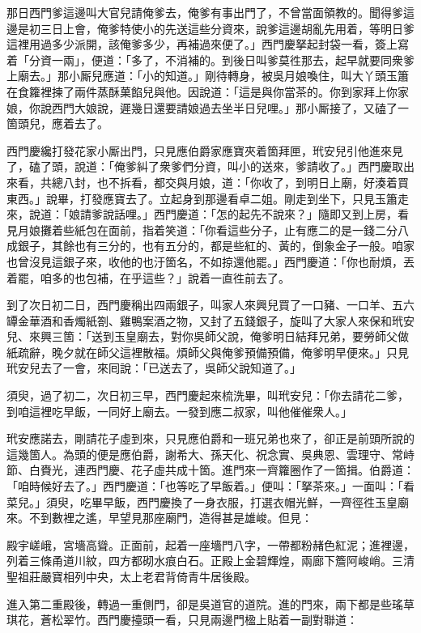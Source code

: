 那日西門爹這邊叫大官兒請俺爹去，俺爹有事出門了，不曾當面領教的。聞得爹這邊是初三日上會，俺爹特使小的先送這些分資來，說爹這邊胡亂先用着，等明日爹這裡用過多少派開，該俺爹多少，再補過來便了。」西門慶拏起封袋一看，簽上寫着「分資一兩」，便道：「多了，不消補的。到後日叫爹莫徃那去，起早就要同衆爹上廟去。」那小厮兒應道：「小的知道。」剛待轉身，被吳月娘喚住，{}叫大丫頭玉簫在食籮裡揀了兩件蒸酥菓餡兒與他。因說道：「這是與你當茶的。你到家拜上你家娘，{}你說西門大娘說，遲幾日還要請娘過去坐半日兒哩。」那小厮接了，又磕了一箇頭兒，應着去了。

西門慶纔打發花家小厮出門，只見應伯爵家應寶夾着箇拜匣，玳安兒引他進來見了，磕了頭，說道：「俺爹糾了衆爹們分資，叫小的送來，爹請收了。」西門慶取出來看，共總八封，也不拆看，都交與月娘，道：「你收了，到明日上廟，好湊着買東西。」說畢，打發應寶去了。立起身到那邊看卓二姐。剛走到坐下，只見玉簫走來，說道：「娘請爹說話哩。」{}西門慶道：「怎的起先不說來？」隨即又到上房，看見月娘攤着些紙包在面前，指着笑道：「你看這些分子，止有應二的是一錢二分八成銀子，其餘也有三分的，也有五分的，都是些紅的、黃的，倒象金子一般。咱家也曾沒見這銀子來，收他的也汙箇名，不如掠還他罷。」西門慶道：「你也耐煩，丟着罷，咱多的也包補，在乎這些？」說着一直徃前去了。

到了次日初二日，西門慶稱出四兩銀子，叫家人來興兒買了一口豬、一口羊、五六罈金華酒和香燭紙劄、雞鴨案酒之物，又封了五錢銀子，旋叫了大家人來保和玳安兒、來興三箇：「送到玉皇廟去，對你吳師父說，俺爹明日結拜兄弟，要勞師父做紙疏辭，晚夕就在師父這裡散福。煩師父與俺爹預備預備，俺爹明早便來。」只見玳安兒去了一會，來囘說：「已送去了，吳師父說知道了。」

須臾，過了初二，次日初三早，西門慶起來梳洗畢，叫玳安兒：「你去請花二爹，到咱這裡吃早飯，一同好上廟去。一發到應二叔家，叫他催催衆人。」

玳安應諾去，剛請花子虛到來，只見應伯爵和一班兄弟也來了，卻正是前頭所說的這幾箇人。為頭的便是應伯爵，謝希大、孫天化、祝念實、吳典恩、雲理守、常峙節、白賚光，連西門慶、花子虛共成十箇。進門來一齊籮圈作了一箇揖。伯爵道：「咱時候好去了。」西門慶道：「也等吃了早飯着。」便叫：「拏茶來。」一面叫：「看菜兒。」須臾，吃畢早飯，西門慶換了一身衣服，打選衣帽光鮮，一齊徑徃玉皇廟來。不到數裡之遙，早望見那座廟門，造得甚是雄峻。但見：

殿宇嵯峨，宮墻高聳。正面前，起着一座墻門八字，一帶都粉赭色紅泥；進裡邊，列着三條甬道川紋，四方都砌水痕白石。正殿上金碧輝煌，兩廊下簷阿峻峭。三清聖祖莊嚴寶相列中央，太上老君背倚青牛居後殿。

進入第二重殿後，轉過一重側門，卻是吳道官的道院。進的門來，兩下都是些瑤草琪花，蒼松翠竹。西門慶擡頭一看，只見兩邊門楹上貼着一副對聯道：

